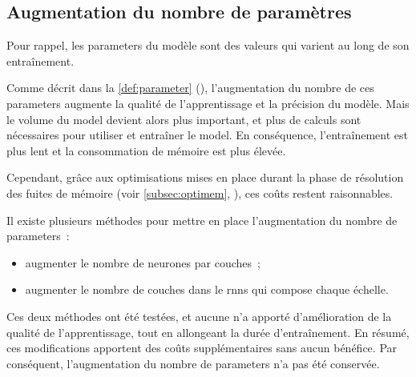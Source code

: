 \pagebreak
\subsection{Augmentation du nombre de paramètres}\label{subsec:optiparam}
Pour rappel, les \glspl{parameter} du modèle sont des valeurs qui varient au long de son entraînement.

Comme décrit dans la \autoref{def:parameter} (), %
l'augmentation du nombre de ces \glspl{parameter} augmente la qualité de l'apprentissage et la précision du modèle. Mais le volume du \gls{model} devient alors plus important, et plus de calculs sont nécessaires pour utiliser et entraîner le \gls{model}. En conséquence, l'entraînement est plus lent et la consommation de mémoire est plus élevée.

Cependant, grâce aux optimisations mises en place durant la phase de résolution des fuites de mémoire (voir \autoref{subsec:optimem}, ), ces coûts restent raisonnables.

Il existe plusieurs méthodes pour mettre en place l'augmentation du nombre de \glspl{parameter}~:
\begin{itemize}
	\item augmenter le nombre de neurones par couches~;
	\item augmenter le nombre de couches dans le \glspl{rnn} qui compose chaque \og échelle\fg{}.
\end{itemize}
\vspace{1em}

Ces deux méthodes ont été testées, et aucune n'a apporté d'amélioration de la qualité de l'apprentissage, tout en allongeant la durée d'entraînement.
En résumé, ces modifications apportent des coûts supplémentaires sans aucun bénéfice. Par conséquent, l'augmentation du nombre de \glspl{parameter} n'a pas été conservée.